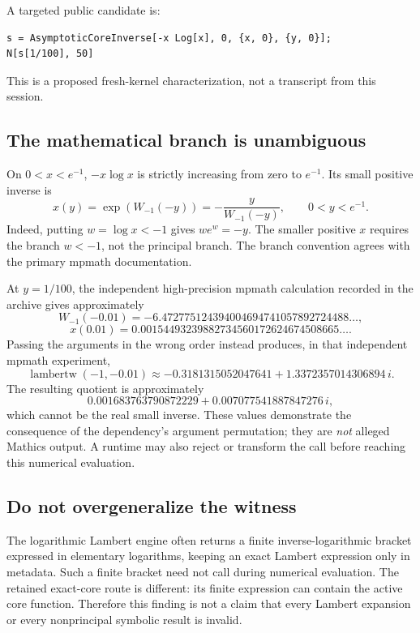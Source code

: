 \documentclass[11pt,letterpaper]{article}
\newcommand{\code}[1]{\texttt{\detokenize{#1}}}
\begin{document}
A targeted public candidate is:
\begin{lstlisting}
s = AsymptoticCoreInverse[-x Log[x], 0, {x, 0}, {y, 0}];
N[s[1/100], 50]
\end{lstlisting}
This is a proposed fresh-kernel characterization, not a transcript from this session.

\subsection{The mathematical branch is unambiguous}

On $0<x<e^{-1}$, $-x\log x$ is strictly increasing from zero to $e^{-1}$. Its small positive inverse is
\begin{equation}\label{eq:entropy-inverse}
 x(y)=\exp(W_{-1}(-y))=-\frac{y}{W_{-1}(-y)},
 \qquad 0<y<e^{-1}.
\end{equation}
Indeed, putting $w=\log x<-1$ gives $we^w=-y$. The smaller positive $x$ requires the branch $w<-1$, not the principal branch. The branch convention agrees with the primary mpmath documentation.\cite{mpmath-w}

At $y=1/100$, the independent high-precision mpmath calculation recorded in the archive gives approximately
\[
 W_{-1}(-0.01)=-6.472775124394004694741057892724488\ldots,
\]
\[
 x(0.01)=0.00154493239882734560172624674508665\ldots.
\]
Passing the arguments in the wrong order instead produces, in that independent mpmath experiment,
\[
 \operatorname{lambertw}(-1,-0.01)
 \approx -0.3181315052047641+1.3372357014306894\,i.
\]
The resulting quotient is approximately
\[
 0.001683763790872229+0.007077541887847276\,i,
\]
which cannot be the real small inverse. These values demonstrate the consequence of the dependency's argument permutation; they are \emph{not} alleged Mathics output. A runtime may also reject or transform the call before reaching this numerical evaluation.

\subsection{Do not overgeneralize the witness}

The logarithmic Lambert engine often returns a finite inverse-logarithmic bracket expressed in elementary logarithms, keeping an exact Lambert expression only in metadata. Such a finite bracket need not call \code{ProductLog} during numerical evaluation. The retained exact-core route is different: its finite expression can contain the active core function. Therefore this finding is not a claim that every Lambert expansion or every nonprincipal symbolic result is invalid.\cite{lambert,core-perturbation}
\end{document}
